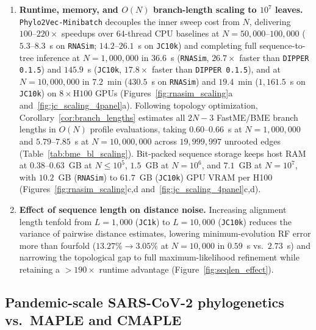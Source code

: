\documentclass[11pt,a4paper]{article}
\makeatletter
\DeclareRobustCommand{\_}{\ifmmode\nfss@text{\textunderscore}\else\textunderscore\allowbreak\fi}
\theoremstyle{definition}
\makeatother
\begin{document}
\begin{enumerate}
 \item \textbf{Runtime, memory, and $O(N)$ branch-length scaling to $10^7$ leaves.} \texttt{Phylo2Vec-Minibatch} decouples the inner sweep cost from $N$, delivering $100\text{--}220\times$ speedups over 64-thread CPU baselines at $N=50{,}000\text{--}100{,}000$ ($5.3\text{--}8.3$~s on \texttt{RNASim}; $14.2\text{--}26.1$~s on \texttt{JC10k}) and completing full sequence-to-tree inference at $N=1{,}000{,}000$ in $36.6$~s (\texttt{RNASim}, $26.7\times$ faster than \texttt{DIPPER 0.1.5}) and $145.9$~s (\texttt{JC10k}, $17.8\times$ faster than \texttt{DIPPER 0.1.5}), and at $N=10{,}000{,}000$ in $7.2$~min ($430.5$~s on \texttt{RNASim}) and $19.4$~min ($1{,}161.5$~s on \texttt{JC10k}) on $8\times\text{H100}$ GPUs (Figures~\ref{fig:rnasim_scaling}a and~\ref{fig:jc_scaling_4panel}a). Following topology optimization, Corollary~\ref{cor:branch_lengths} estimates all $2N-3$ FastME/BME branch lengths in $O(N)$ profile evaluations, taking $0.60\text{--}0.66$~s at $N=1{,}000{,}000$ and $5.79\text{--}7.85$~s at $N=10{,}000{,}000$ across $19{,}999{,}997$ unrooted edges (Table~\ref{tab:bme_bl_scaling}). Bit-packed sequence storage keeps host RAM at $0.38\text{--}0.63$~GB at $N\le 10^5$, $1.5$~GB at $N=10^6$, and $7.1$~GB at $N=10^7$, with $10.2$~GB (\texttt{RNASim}) to $61.7$~GB (\texttt{JC10k}) GPU VRAM per H100 (Figures~\ref{fig:rnasim_scaling}c,d and~\ref{fig:jc_scaling_4panel}c,d).
 \item \textbf{Effect of sequence length on distance noise.} Increasing alignment length tenfold from $L=1{,}000$ (\texttt{JC1k}) to $L=10{,}000$ (\texttt{JC10k}) reduces the variance of pairwise distance estimates, lowering minimum-evolution RF error more than fourfold ($13.27\%\to3.05\%$ at $N=10{,}000$ in $0.59$~s vs.\ $2.73$~s) and narrowing the topological gap to full maximum-likelihood refinement while retaining a $>190\times$ runtime advantage (Figure~\ref{fig:seqlen_effect}).
\end{enumerate}

\subsection{Pandemic-scale SARS-CoV-2 phylogenetics vs.\ MAPLE and CMAPLE}
\label{sec:cmaple}
\end{document}

